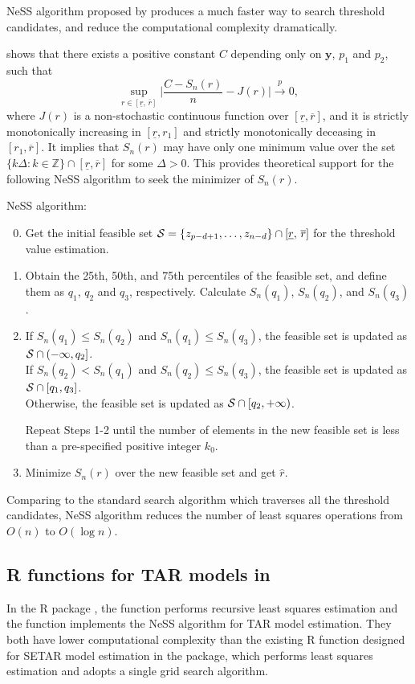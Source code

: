  NeSS algorithm proposed by \cite{li2016} produces a much faster way to search threshold candidates, and reduce the computational complexity dramatically.

\cite{li2016} shows that there exists a positive constant $C$ depending only on ${\mathbf y}$, $p_1$ and $p_2$, such that
\[
\sup_{r \in [ \underline{r}, \, \overline{r}]} \Big | \frac{C-S_n(r)}{n}-J(r) \Big| \overset{p}{\to} 0,
\]
where $J(r)$ is a non-stochastic continuous function over $[\underline{r}, \overline{r}]$, and it is strictly monotonically increasing in $[\underline{r}, r_1]$ and strictly monotonically deceasing in $[r_1, \overline{r}]$. It implies that $S_n(r)$ may have only one minimum value over the set $\{k\Delta: k\in {\mathbb{Z}}\} \cap [\underline{r}, \overline{r}]$ for some $\Delta>0$. This provides theoretical support for the following NeSS algorithm to seek the minimizer of $S_n(r)$.

NeSS algorithm:
\begin{enumerate}
\setcounter{enumi}{-1}
\item Get the initial feasible set ${\cal S}=\{{z}_{p-d+1},\ldots,{z}_{n-d}\}\cap [\underline{r},\, \overline{r}]$ for the threshold value estimation.

\item Obtain the 25th, 50th, and 75th percentiles of the feasible set, and define them as $q_1$, $q_2$ and $q_3$, respectively. Calculate $S_n(q_1)$, $S_n(q_2)$, and $S_n(q_3)$. 
\item If $S_n(q_1)\leq S_n(q_2)$ and $S_n(q_1)\leq S_n(q_3)$, the feasible set is updated as ${\cal S} \cap (-\infty,q_2]$.\\ If $S_n(q_2)< S_n(q_1)$ and $S_n(q_2)\leq S_n(q_3)$, the feasible set is updated as ${\cal S} \cap [q_1,q_3]$. \\
Otherwise, the feasible set is updated as ${\cal S} \cap [q_2, +\infty)$.  

Repeat Steps 1-2 until the number of elements in the new feasible set is less than a pre-specified positive integer $k_0$.
\item Minimize $S_n(r)$ over the new feasible set and get $\hat{r}$.
\end{enumerate}

Comparing to the standard search algorithm which traverses all the threshold candidates, NeSS algorithm reduces the number of least squares operations from $O(n)$ to $O(\log n)$.

\subsection{R functions for TAR models in }
In the R package , the function  performs recursive least squares estimation and the function  implements the NeSS algorithm for TAR model estimation. They both have lower computational complexity than the existing {R} function  designed for SETAR model estimation in
the {} package, which performs least squares estimation
and adopts a single grid search algorithm. 

